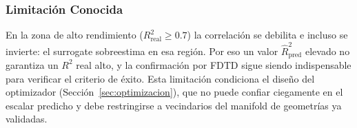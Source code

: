 \subsubsection{Limitación Conocida}

En la zona de alto rendimiento ($R^2_{\text{real}} \geq 0.7$) la correlación se debilita e incluso se invierte: el surrogate sobreestima en esa región. Por eso un valor $\hat{R}^2_{\text{pred}}$ elevado no garantiza un $R^2$ real alto, y la confirmación por FDTD sigue siendo indispensable para verificar el criterio de éxito. Esta limitación condiciona el diseño del optimizador (Sección~\ref{sec:optimizacion}), que no puede confiar ciegamente en el escalar predicho y debe restringirse a vecindarios del manifold de geometrías ya validadas.
